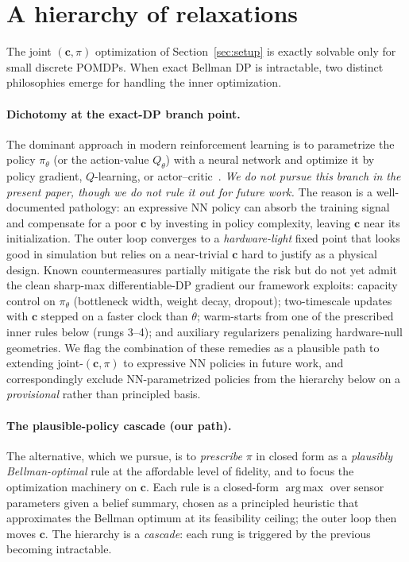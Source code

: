 \documentclass[11pt,a4paper,onecolumn]{article}
\newcommand{\argmax}{\operatorname*{arg\,max}}
\newcommand{\bc}{\bm{c}}
\begin{document}
\section{A hierarchy of relaxations}
\label{sec:hierarchy}

The joint $(\bc, \pi)$ optimization of Section~\ref{sec:setup} is exactly solvable only for small discrete POMDPs.  When exact Bellman DP is intractable, two distinct philosophies emerge for handling the inner optimization.

\paragraph{Dichotomy at the exact-DP branch point.}  The dominant approach in modern reinforcement learning is to parametrize the policy $\pi_\theta$ (or the action-value $Q_\theta$) with a neural network and optimize it by policy gradient, $Q$-learning, or actor--critic~\cite{hausknecht2015deep, zhong2018deep}.  \emph{We do not pursue this branch in the present paper, though we do not rule it out for future work.}  The reason is a well-documented pathology: an expressive NN policy can absorb the training signal and compensate for a poor $\bc$ by investing in policy complexity, leaving $\bc$ near its initialization.  The outer loop converges to a \emph{hardware-light} fixed point that looks good in simulation but relies on a near-trivial $\bc$ hard to justify as a physical design.  Known countermeasures partially mitigate the risk but do not yet admit the clean sharp-max differentiable-DP gradient our framework exploits: capacity control on $\pi_\theta$ (bottleneck width, weight decay, dropout); two-timescale updates with $\bc$ stepped on a faster clock than $\theta$; warm-starts from one of the prescribed inner rules below (rungs 3--4); and auxiliary regularizers penalizing hardware-null geometries.  We flag the combination of these remedies as a plausible path to extending joint-$(\bc, \pi)$ to expressive NN policies in future work, and correspondingly exclude NN-parametrized policies from the hierarchy below on a \emph{provisional} rather than principled basis.

\paragraph{The plausible-policy cascade (our path).}  The alternative, which we pursue, is to \emph{prescribe} $\pi$ in closed form as a \emph{plausibly Bellman-optimal} rule at the affordable level of fidelity, and to focus the optimization machinery on $\bc$.  Each rule is a closed-form $\argmax$ over sensor parameters given a belief summary, chosen as a principled heuristic that approximates the Bellman optimum at its feasibility ceiling; the outer loop then moves $\bc$.  The hierarchy is a \emph{cascade}: each rung is triggered by the previous becoming intractable.
\end{document}
